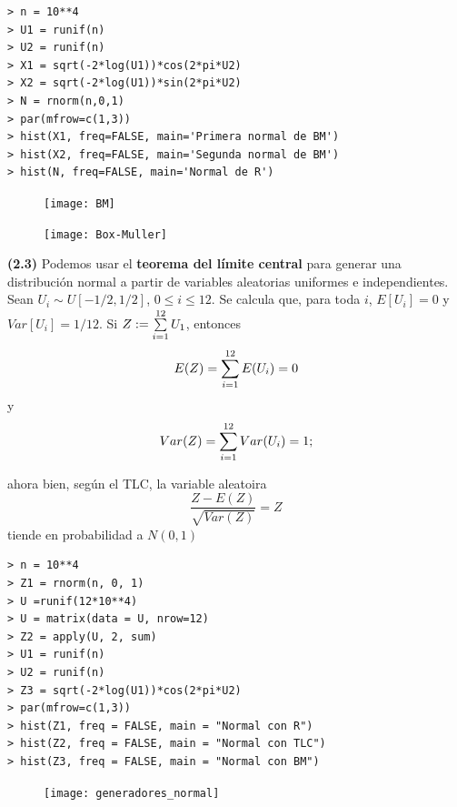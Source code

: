 \begin{verbatim}
> n = 10**4
> U1 = runif(n)
> U2 = runif(n)
> X1 = sqrt(-2*log(U1))*cos(2*pi*U2)
> X2 = sqrt(-2*log(U1))*sin(2*pi*U2)
> N = rnorm(n,0,1)
> par(mfrow=c(1,3))
> hist(X1, freq=FALSE, main='Primera normal de BM')
> hist(X2, freq=FALSE, main='Segunda normal de BM')
> hist(N, freq=FALSE, main='Normal de R')
\end{verbatim}
\begin{figure}[H]
	\centering
	\texttt{[image: BM]} 
\end{figure}	

\begin{figure}[H]
	\sidecaption{
	\label{fig: BM explained}
	}
	\centering
	\texttt{[image: Box-Muller]} 
\end{figure}	

\begin{ejercicio}
\textbf{(2.3)} Podemos usar el \textbf{teorema del 
límite central} para generar una distribución normal a partir de 
variables aleatorias uniformes e independientes. \\

Sean $U_{i} \sim U[-1/2, 1/2]$, $0 \leq i \leq 12$.
Se calcula que, para toda $i$, $E[U_{i}]=0$ y
$Var[U_{i}] = 1/12$.
Si $Z := \sum\limits_{i=1}^{12}U_{1}$, entonces
\[
E(Z) = \sum\limits_{i=1}^{12}E(U_{i}) = 0
\]
y 
\[
Var(Z) = \sum\limits_{i=1}^{12}Var(U_{i}) = 1;
\]

\noindent
ahora bien, según el TLC, la variable aleatoira
\[
\frac{Z - E(Z)}{\sqrt{Var(Z)}} = Z
\]
tiende en probabilidad a $N(0,1)$
\begin{verbatim}
> n = 10**4
> Z1 = rnorm(n, 0, 1)
> U =runif(12*10**4)
> U = matrix(data = U, nrow=12)
> Z2 = apply(U, 2, sum)
> U1 = runif(n)
> U2 = runif(n)
> Z3 = sqrt(-2*log(U1))*cos(2*pi*U2)
> par(mfrow=c(1,3))
> hist(Z1, freq = FALSE, main = "Normal con R")
> hist(Z2, freq = FALSE, main = "Normal con TLC")
> hist(Z3, freq = FALSE, main = "Normal con BM")
\end{verbatim}
\end{ejercicio}
\begin{figure}[H]
	\centering
	\texttt{[image: generadores\_normal]} 
\end{figure}	

